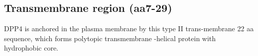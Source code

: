 \subsection{Transmembrane region (aa7-29)}

DPP4 is anchored in the plasma membrane by this type II trans-membrane 22 aa sequence, which forms polytopic transmembrane \alpha-helical protein with hydrophobic core.~\cite{Hong_1990}